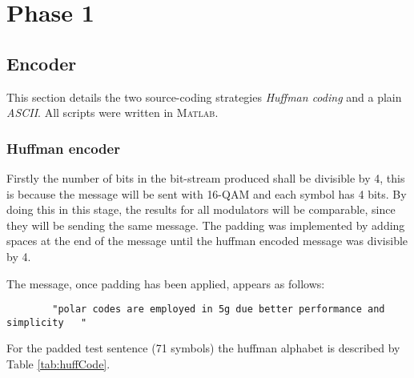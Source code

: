 \section{Phase 1}

\subsection{Encoder}

\label{sec:encoder}

This section details the two source-coding strategies \emph{Huffman coding} and a plain \emph{ASCII}. All scripts were written in \textsc{Matlab}.

\subsubsection{Huffman encoder}
\label{ssec:huffman}


Firstly the number of bits in the bit-stream produced shall be divisible by 4, this is because the message will be sent with 16-QAM and each symbol has 4 bits. By doing this in this stage, the results for all modulators will be comparable, since they will be sending the same message. The padding was implemented by adding spaces at the end of the message until the huffman encoded message was divisible by 4.

The message, once padding has been applied, appears as follows:

\begin{center}
    \begin{verbatim}
        "polar codes are employed in 5g due better performance and simplicity   "
    \end{verbatim}
    
\end{center}

For the padded test sentence (71 symbols) the huffman alphabet is described by Table \ref{tab:huffCode}.

